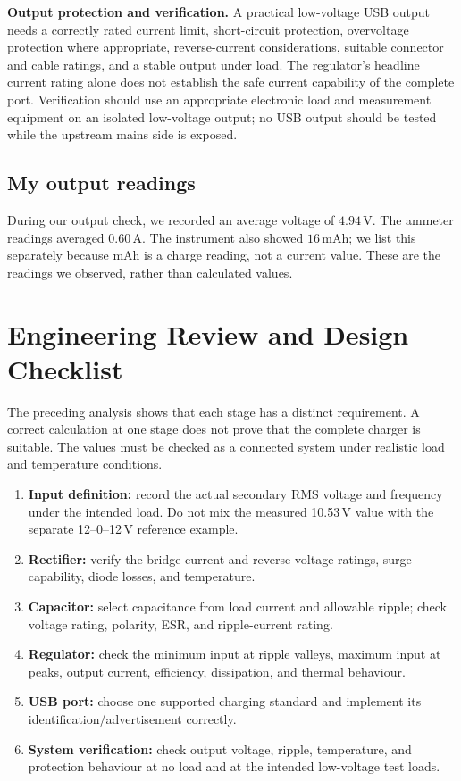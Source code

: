 \documentclass[journal,12pt,twocolumn]{IEEEtran}
\begin{document}
\textbf{Output protection and verification.}
A practical low-voltage USB output needs a correctly rated current
limit, short-circuit protection, overvoltage protection where
appropriate, reverse-current considerations, suitable connector
and cable ratings, and a stable output under load. The regulator's
headline current rating alone does not establish the safe current
capability of the complete port. Verification should use an
appropriate electronic load and measurement equipment on an
isolated low-voltage output; no USB output should be tested while
the upstream mains side is exposed.

\subsection*{My output readings}
During our output check, we recorded an average voltage of
$4.94\,\mathrm{V}$. The ammeter readings averaged
$0.60\,\mathrm{A}$. The instrument also showed $16\,\mathrm{mAh}$;
we list this separately because mAh is a charge reading, not a current
value. These are the readings we observed, rather than calculated
values.

\section{Engineering Review and Design Checklist}
The preceding analysis shows that each stage has a distinct
requirement. A correct calculation at one stage does not prove that
the complete charger is suitable. The values must be checked as a
connected system under realistic load and temperature conditions.

\begin{enumerate}[leftmargin=1.6em]
    \item \textbf{Input definition:} record the actual secondary RMS
    voltage and frequency under the intended load. Do not mix the
    measured 10.53\,V value with the separate 12--0--12\,V reference
    example.
    \item \textbf{Rectifier:} verify the bridge current and reverse
    voltage ratings, surge capability, diode losses, and temperature.
    \item \textbf{Capacitor:} select capacitance from load current
    and allowable ripple; check voltage rating, polarity, ESR, and
    ripple-current rating.
    \item \textbf{Regulator:} check the minimum input at ripple
    valleys, maximum input at peaks, output current, efficiency,
    dissipation, and thermal behaviour.
    \item \textbf{USB port:} choose one supported charging standard
    and implement its identification/advertisement correctly.
    \item \textbf{System verification:} check output voltage, ripple,
    temperature, and protection behaviour at no load and at the
    intended low-voltage test loads.
\end{enumerate}
\end{document}
